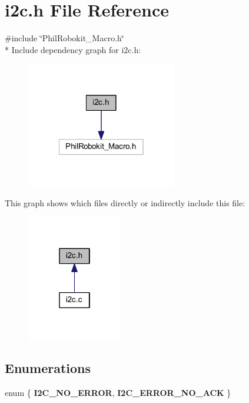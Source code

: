 \section{i2c.\-h File Reference}
\label{i2c_8h}
{\ttfamily \#include \char`\"{}Phil\-Robokit\-\_\-\-Macro.\-h\char`\"{}}\\*
Include dependency graph for i2c.\-h\-:\nopagebreak
\begin{figure}[H]
\begin{center}
\leavevmode
\includegraphics[width=186pt]{i2c_8h__incl}
\end{center}
\end{figure}
This graph shows which files directly or indirectly include this file\-:\nopagebreak
\begin{figure}[H]
\begin{center}
\leavevmode
\includegraphics[width=118pt]{i2c_8h__dep__incl}
\end{center}
\end{figure}
\subsection*{Enumerations}
\begin{DoxyCompactItemize}
\item 
enum \{ {\bf I2\-C\-\_\-\-N\-O\-\_\-\-E\-R\-R\-O\-R}, 
{\bf I2\-C\-\_\-\-E\-R\-R\-O\-R\-\_\-\-N\-O\-\_\-\-A\-C\-K}
 \}
\end{DoxyCompactItemize}
